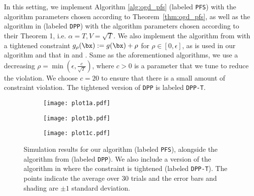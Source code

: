 In this setting, we implement Algorithm \ref{alg:ogd_pfs} (labeled \texttt{PFS}) with the algorithm parameters chosen according to Theorem~\ref{thm:ogd_pfs}, as well as the algorithm in \citet{yu2017online} (labeled \texttt{DPP}) with the algorithm parameters chosen according to their Theorem 1, i.e. $\alpha = T, V = \sqrt{T}$.
We also implement the algorithm from \citet{yu2017online} with a tightened constraint $g_\rho(\bx) := g(\bx) + \rho$ for $\rho \in [0,\epsilon]$, as is used in our algorithm and that in \citet{mahdavi2012trading} and \citet{jenatton2016adaptive}.
Same as the aforementioned algorithms, we use a decreasing $\rho = \min(\epsilon, \frac{c}{\sqrt{T}})$, where $c>0$ is a parameter that we tune to reduce the violation.
We choose $c = 20$ to ensure that there is a small amount of constraint violation.
The tightened version of \texttt{DPP} is labeled \texttt{DPP-T}.


\begin{figure*}[t]
    \centering
    \begin{subfigure}[t]{0.28\textwidth}
        \centering    
        \texttt{[image: plot1a.pdf]}
        \vspace{-0.2in}
        \caption{}
        \label{fig:expers:a}
    \end{subfigure}
    \hspace{0.04\textwidth}
    \begin{subfigure}[t]{0.28\textwidth}
        \centering    
        \texttt{[image: plot1b.pdf]}
        \vspace{-0.2in}
        \caption{}
        \label{fig:expers:b}
    \end{subfigure}
    \hspace{0.04\textwidth}
    \begin{subfigure}[t]{0.28\textwidth}
        \centering    
        \texttt{[image: plot1c.pdf]}
        \vspace{-0.2in}
        \caption{}
        \label{fig:expers:c}
    \end{subfigure}
   \caption{Simulation results for our algorithm (labeled \texttt{PFS}), alongside the algorithm from \citet{yu2017online} (labeled \texttt{DPP}). We also include a version of the algorithm in \citet{yu2017online} where the constraint is tightened (labeled \texttt{DPP-T}). The points indicate the average over 30 trials and the error bars and shading are $\pm 1$ standard deviation.}
   \label{fig:expers}
\end{figure*}

